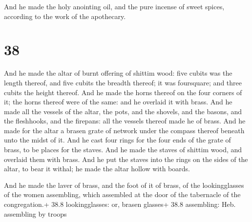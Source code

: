  And he made the holy anointing oil, and the pure incense
of sweet spices, according to the work of the apothecary.

\hypertarget{section-37}{%
\section{38}\label{section-37}}

 And he made the altar of burnt offering of shittim wood:
five cubits was the length thereof, and five cubits the breadth thereof;
it was foursquare; and three cubits the height thereof.  And
he made the horns thereof on the four corners of it; the horns thereof
were of the same: and he overlaid it with brass.  And he
made all the vessels of the altar, the pots, and the shovels, and the
basons, and the fleshhooks, and the firepans: all the vessels thereof
made he of brass.  And he made for the altar a brasen grate
of network under the compass thereof beneath unto the midst of it.
 And he cast four rings for the four ends of the grate of
brass, to be places for the staves.  And he made the staves
of shittim wood, and overlaid them with brass.  And he put
the staves into the rings on the sides of the altar, to bear it withal;
he made the altar hollow with boards.

 And he made the laver of brass, and the foot of it of
brass, of the lookingglasses of the women assembling, which assembled at
the door of the tabernacle of the congregation.+ 38.8 lookingglasses:
or, brasen glasses+ 38.8 assembling: Heb. assembling by troops

